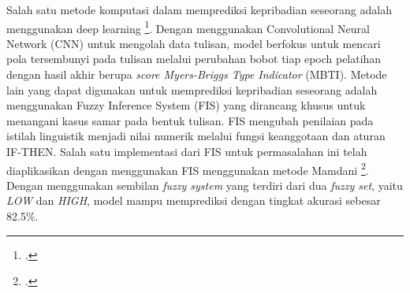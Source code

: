 \documentclass[a4paper,twoside]{article}
\begin{document}
	Salah satu metode komputasi dalam memprediksi kepribadian seseorang adalah menggunakan deep learning \footcite{gagiu2025detection}. Dengan menggunakan Convolutional Neural Network (CNN) 
	untuk mengolah data tulisan, model berfokus untuk mencari pola tersembunyi pada tulisan melalui perubahan bobot tiap epoch pelatihan dengan hasil akhir berupa 
	\textit{score Myers-Briggs Type Indicator} (MBTI). Metode lain yang dapat digunakan untuk memprediksi kepribadian seseorang adalah menggunakan Fuzzy Inference System (FIS) yang dirancang khusus untuk menangani kasus samar pada bentuk tulisan. 
	FIS mengubah penilaian pada istilah linguistik menjadi nilai numerik melalui fungsi keanggotaan dan aturan IF-THEN. Salah satu implementasi dari FIS 
	untuk permasalahan ini telah diaplikasikan dengan menggunakan FIS menggunakan metode Mamdani \footcite{ghods2023personality}. Dengan menggunakan sembilan 
	\textit{fuzzy system} yang terdiri dari dua \textit{fuzzy set}, yaitu \textit{LOW} dan \textit{HIGH}, model mampu memprediksi dengan tingkat akurasi 
	sebesar 82.5\%.
\end{document}
